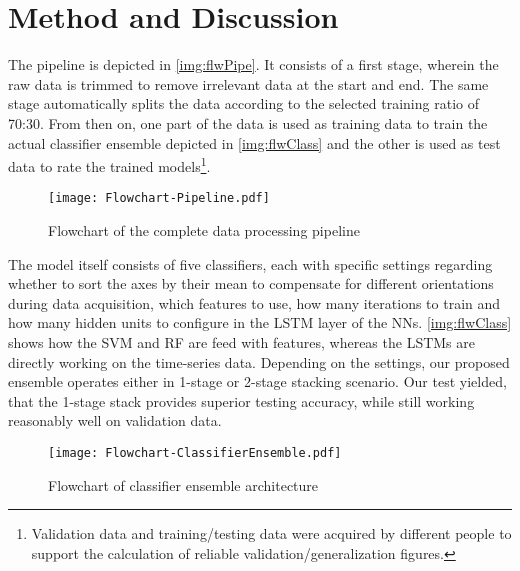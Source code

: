 \section{Method and Discussion}
 The pipeline is depicted in \autoref{img:flwPipe}. It consists of a first stage, wherein the raw data is trimmed to remove irrelevant data at the start and end. The same stage automatically splits the data according to the selected training ratio of 70:30. From then on, one part of the data is used as training data to train the actual classifier ensemble depicted in \autoref{img:flwClass} and the other is used as test data to rate the trained models\footnote{Validation data and training/testing data were acquired by different people to support the calculation of reliable validation/generalization figures.}.

\begin{figure}[hbtp]
\centering
\texttt{[image: Flowchart-Pipeline.pdf]}
\caption{Flowchart of the complete data processing pipeline}
  \label{img:flwPipe}
\end{figure}

The model itself consists of five classifiers, each with specific settings regarding whether to sort the axes by their mean to compensate for different orientations during data acquisition, which features to use, how many iterations to train and how many hidden units to configure in the \ac{LSTM} layer of the \acp{NN}. \autoref{img:flwClass} shows how the \ac{SVM} and \ac{RF} are feed with features, whereas the \acp{LSTM} are directly working on the time-series data. Depending on the settings, our proposed ensemble operates either in 1-stage or 2-stage stacking scenario. Our test yielded, that the 1-stage stack provides superior testing accuracy, while still working reasonably well on validation data.

\begin{figure}[hbtp]
\centering 
\texttt{[image: Flowchart-ClassifierEnsemble.pdf]}
\caption{Flowchart of classifier ensemble architecture}
  \label{img:flwClass}
\end{figure}

